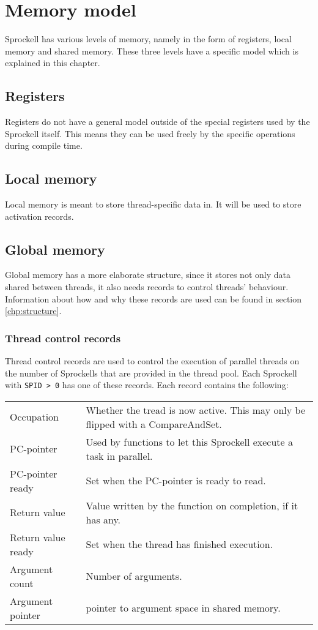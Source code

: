 \documentclass[10pt,a4paper]{report}
\begin{document}
\chapter{Memory model}
Sprockell has various levels of memory, namely in the form of registers, local memory and shared memory. These three levels have a specific model which is explained in this chapter.

\section{Registers}
Registers do not have a general model outside of the special registers used by the Sprockell itself. This means they can be used freely by the specific operations during compile time.

\section{Local memory}
Local memory is meant to store thread-specific data in. It will be used to store activation records. 

\section{Global memory}
Global memory has a more elaborate structure, since it stores not only data shared between threads, it also needs records to control threads' behaviour. Information about how and why these records are used can be found in section \ref{chp:structure}. 

\subsection{Thread control records}
Thread control records are used to control the execution of parallel threads on the number of Sprockells that are provided in the thread pool. Each Sprockell with \texttt{SPID > 0} has one of these records. Each record contains the following:

\begin{tabular}{| l || l |}
\hline
Occupation & Whether the tread is now active. This may only be flipped with a CompareAndSet. \\
PC-pointer & Used by functions to let this Sprockell execute a task in parallel. \\
PC-pointer ready & Set when the PC-pointer is ready to read. \\
Return value & Value written by the function on completion, if it has any. \\
Return value ready & Set when the thread has finished execution. \\
Argument count & Number of arguments. \\
Argument pointer & pointer to argument space in shared memory. \\ 
\hline
\end{tabular}
\end{document}

